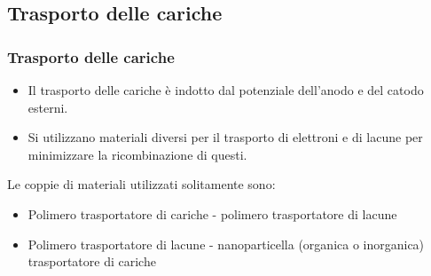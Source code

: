 \documentclass{beamer}
\begin{document}
  \subsection{Trasporto delle cariche}
    \begin{frame}
      \frametitle{
      Trasporto delle cariche}
	\begin{itemize}
	  \item Il trasporto delle cariche è indotto dal potenziale dell'anodo e del catodo esterni.
	  \item Si utilizzano materiali diversi per il trasporto di elettroni e di lacune per \alert{minimizzare la ricombinazione} di questi.
	\end{itemize}\pause
	Le coppie di materiali utilizzati solitamente sono:
	\begin{itemize}
	 \item \alert{Polimero} trasportatore di cariche - \alert{polimero} trasportatore di lacune
	 \item \alert{Polimero} trasportatore di lacune - \alert{nanoparticella} (organica o inorganica) trasportatore di cariche
	\end{itemize}
    \end{frame}
\end{document}
